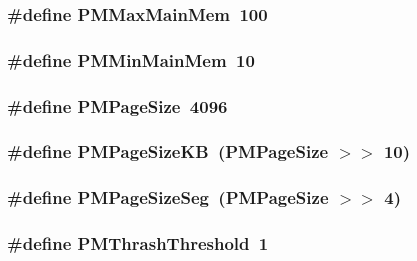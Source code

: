 \label{ID__PM_8H_a9f2f9b21608730589c4e27d6aa584959}
\hypertarget{ID__PM_8H_a82525b0875c0007597f80f287b853d05}{
\subsubsection[{PMMaxMainMem}]{\setlength{\rightskip}{0pt plus 5cm}\#define PMMaxMainMem~100}}
\label{ID__PM_8H_a82525b0875c0007597f80f287b853d05}
\hypertarget{ID__PM_8H_a5a6fe12b7cbcef7f1fb3c798f3265db5}{
\subsubsection[{PMMinMainMem}]{\setlength{\rightskip}{0pt plus 5cm}\#define PMMinMainMem~10}}
\label{ID__PM_8H_a5a6fe12b7cbcef7f1fb3c798f3265db5}
\hypertarget{ID__PM_8H_a5e4c70ba1e278d1d2fb9cec2b0fecadb}{
\subsubsection[{PMPageSize}]{\setlength{\rightskip}{0pt plus 5cm}\#define PMPageSize~4096}}
\label{ID__PM_8H_a5e4c70ba1e278d1d2fb9cec2b0fecadb}
\hypertarget{ID__PM_8H_aca70fe2da2793734afbb08715dd5d545}{
\subsubsection[{PMPageSizeKB}]{\setlength{\rightskip}{0pt plus 5cm}\#define PMPageSizeKB~(PMPageSize $>$$>$ 10)}}
\label{ID__PM_8H_aca70fe2da2793734afbb08715dd5d545}
\hypertarget{ID__PM_8H_a7d4ab7bf0b85e8db8ee6ceccacb16e39}{
\subsubsection[{PMPageSizeSeg}]{\setlength{\rightskip}{0pt plus 5cm}\#define PMPageSizeSeg~(PMPageSize $>$$>$ 4)}}
\label{ID__PM_8H_a7d4ab7bf0b85e8db8ee6ceccacb16e39}
\hypertarget{ID__PM_8H_a7340787578cedc2eff541f5ce36699ac}{
\subsubsection[{PMThrashThreshold}]{\setlength{\rightskip}{0pt plus 5cm}\#define PMThrashThreshold~1}}
